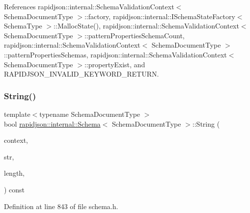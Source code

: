 \begin{DoxyCode}{0}
\end{DoxyCode}


References rapidjson\+::internal\+::\+Schema\+Validation\+Context$<$ Schema\+Document\+Type $>$\+::factory, rapidjson\+::internal\+::\+I\+Schema\+State\+Factory$<$ Schema\+Type $>$\+::\+Malloc\+State(), rapidjson\+::internal\+::\+Schema\+Validation\+Context$<$ Schema\+Document\+Type $>$\+::pattern\+Properties\+Schema\+Count, rapidjson\+::internal\+::\+Schema\+Validation\+Context$<$ Schema\+Document\+Type $>$\+::pattern\+Properties\+Schemas, rapidjson\+::internal\+::\+Schema\+Validation\+Context$<$ Schema\+Document\+Type $>$\+::property\+Exist, and R\+A\+P\+I\+D\+J\+S\+O\+N\+\_\+\+I\+N\+V\+A\+L\+I\+D\+\_\+\+K\+E\+Y\+W\+O\+R\+D\+\_\+\+R\+E\+T\+U\+RN.

\mbox{\label{classrapidjson_1_1internal_1_1_schema_a221dfa37eb3fb9b93c3428f3508ec0c4}} 
\subsubsection{\texorpdfstring{String()}{String()}}
{\footnotesize\ttfamily template$<$typename Schema\+Document\+Type $>$ \\
bool \mbox{\hyperlink{classrapidjson_1_1internal_1_1_schema}{rapidjson\+::internal\+::\+Schema}}$<$ Schema\+Document\+Type $>$\+::String (\begin{DoxyParamCaption}\item[{\mbox{\hyperlink{classrapidjson_1_1internal_1_1_schema_afca06b1f51d1bc18403bdf3f4d55ffef}{Context}} \&}]{context,  }\item[{const \mbox{\hyperlink{classrapidjson_1_1internal_1_1_schema_ab9093cbc42067b8e1d3745eafe096ab3}{Ch}} $\ast$}]{str,  }\item[{\mbox{\hyperlink{namespacerapidjson_a44eb33eaa523e36d466b1ced64b85c84}{Size\+Type}}}]{length,  }\item[{bool}]{ }\end{DoxyParamCaption}) const}



Definition at line 843 of file schema.\+h.


